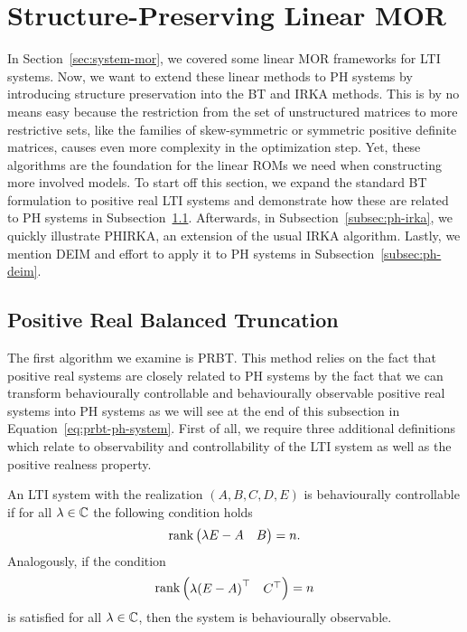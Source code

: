 \section{Structure-Preserving Linear MOR}\label{sec:structure-preserving-mor}

In Section~\ref{sec:system-mor}, we covered some linear \ac{MOR} frameworks for \ac{LTI} systems.
Now, we want to extend these linear methods to \ac{PH} systems by introducing structure preservation into the \ac{BT} and \ac{IRKA} methods.
This is by no means easy because the restriction from the set of unstructured matrices to more restrictive sets, like the families of skew-symmetric or symmetric positive definite matrices, causes even more complexity in the optimization step.
Yet, these algorithms are the foundation for the linear \acp{ROM} we need when constructing more involved models.
To start off this section, we expand the standard \ac{BT} formulation to positive real \ac{LTI} systems and demonstrate how these are related to \ac{PH} systems in Subsection~\ref{subsec:prbt}.
Afterwards, in Subsection~\ref{subsec:ph-irka}, we quickly illustrate \ac{PHIRKA}, an extension of the usual \ac{IRKA} algorithm.
Lastly, we mention \ac{DEIM} and effort to apply it to \ac{PH} systems in Subsection~\ref{subsec:ph-deim}.

\subsection{Positive Real Balanced Truncation}\label{subsec:prbt}

The first algorithm we examine is \acf{PRBT}.
This method relies on the fact that positive real systems are closely related to \ac{PH} systems by the fact that we can transform behaviourally controllable and behaviourally observable positive real systems into \ac{PH} systems as we will see at the end of this subsection in Equation~\eqref{eq:prbt-ph-system}.
First of all, we require three additional definitions which relate to observability and controllability of the \ac{LTI} system as well as the positive realness property.

\begin{definition}
    An \ac{LTI} system with the realization $(A, B, C, D, E)$ is behaviourally controllable if for all $\lambda \in \mathbb{C}$ the following condition holds
    \begin{equation}\label{eq:behaviourally-controllable}
        \mathop{}\!\mathrm{rank}\left(\begin{matrix}
            \lambda E - A & B
        \end{matrix}\right) = n.
    \end{equation}
    Analogously, if the condition
    \begin{equation}\label{eq:behaviourally-observable}
        \mathop{}\!\mathrm{rank}\left(\begin{matrix}
            \lambda {(E - A)}^{\top} & C^{\top}
        \end{matrix}\right) = n
    \end{equation}
    is satisfied for all $\lambda \in \mathbb{C}$, then the system is behaviourally observable.
\end{definition}

